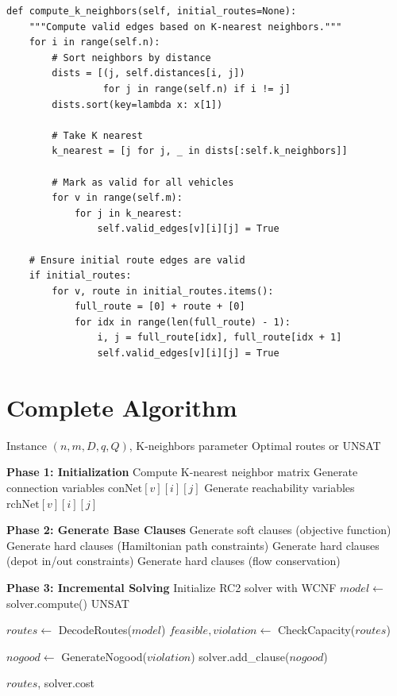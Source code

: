 \documentclass[12pt,a4paper]{article}
\theoremstyle{definition}
\begin{document}
\begin{lstlisting}[caption={K-Nearest Neighbors for Search Space Reduction}]
def compute_k_neighbors(self, initial_routes=None):
    """Compute valid edges based on K-nearest neighbors."""
    for i in range(self.n):
        # Sort neighbors by distance
        dists = [(j, self.distances[i, j]) 
                 for j in range(self.n) if i != j]
        dists.sort(key=lambda x: x[1])
        
        # Take K nearest
        k_nearest = [j for j, _ in dists[:self.k_neighbors]]
        
        # Mark as valid for all vehicles
        for v in range(self.m):
            for j in k_nearest:
                self.valid_edges[v][i][j] = True
    
    # Ensure initial route edges are valid
    if initial_routes:
        for v, route in initial_routes.items():
            full_route = [0] + route + [0]
            for idx in range(len(full_route) - 1):
                i, j = full_route[idx], full_route[idx + 1]
                self.valid_edges[v][i][j] = True
\end{lstlisting}

\section{Complete Algorithm}

\begin{algorithm}[H]
\caption{Incremental MaxSAT for CVRP}
\begin{algorithmic}[1]
\Require Instance $(n, m, D, q, Q)$, K-neighbors parameter
\Ensure Optimal routes or UNSAT

\State \textbf{Phase 1: Initialization}
\State Compute K-nearest neighbor matrix
\State Generate connection variables $\text{conNet}[v][i][j]$
\State Generate reachability variables $\text{rchNet}[v][i][j]$

\State \textbf{Phase 2: Generate Base Clauses}
\State Generate soft clauses (objective function)
\State Generate hard clauses (Hamiltonian path constraints)
\State Generate hard clauses (depot in/out constraints)
\State Generate hard clauses (flow conservation)

\State \textbf{Phase 3: Incremental Solving}
\State Initialize RC2 solver with WCNF
\Repeat
    \State $model \gets$ solver.compute()
        \State \Return UNSAT
    \EndIf
    
    \State $routes \gets$ DecodeRoutes($model$)
    \State $feasible, violation \gets$ CheckCapacity($routes$)
    
        \State $nogood \gets$ GenerateNogood($violation$)
        \State solver.add\_clause($nogood$)
    \EndIf
{}

\State \Return $routes$, solver.cost
\end{algorithmic}
\end{algorithm}
\end{document}
